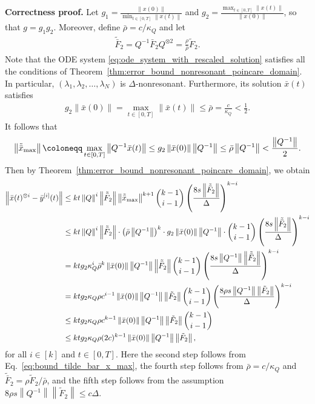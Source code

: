 \documentclass[superscriptaddress,onecolumn,nofootinbib,longbibliography,a4paper,accepted=2026-09-29]{quantumarticle}
\theoremstyle{plain}
\theoremstyle{definition}
\numberwithin{thm}{section}
\numberwithin{assumption}{section}
\numberwithin{lemma}{section}
\numberwithin{prop}{section}
\numberwithin{cor}{section}
\numberwithin{definition}{section}
\numberwithin{rmk}{section}
\numberwithin{equation}{section}
\newcommand{\norm}[1]     {\left\| #1 \right\|}
\newcommand{\lrb}[1]{\left ( #1 \right )}
\newcommand{\defeq}{\coloneqq}
\begin{document}
\noindent \textbf{Correctness proof.}
Let $g_1=\frac{\norm{x(0)}}{\min_{t\in [0,T]} \norm{x(t)}}$ and
$g_2=\frac{\max_{t\in [0, T]}\norm{x(t)}}{\norm{x(0)}}$, so that $g=g_1g_2$. Moreover, define $\bar{\rho}=c/\kappa_Q$ and let
\begin{align}
\tilde{\bar{F}}_2=Q^{-1}\bar{F}_2Q^{\otimes 2}=\frac{\rho}{\bar{\rho}}\tilde{F}_2.    
\end{align}
Note that the ODE system \eqref{eq:ode_system_with_rescaled_solution} satisfies all the conditions of Theorem~\ref{thm:error_bound_nonresonant_poincare_domain}. In particular, $(\lambda_1, \lambda_2, \dots, \lambda_N)$ is $\Delta$-nonresonant. Furthermore, its solution $\bar{x}(t)$  satisfies 
\begin{align}
g_2 \norm{\bar{x}(0)} = \max_{t \in [0, T]}\norm{\bar{x}(t)} \le \bar{\rho}=\frac{c}{\kappa_Q}<\frac{1}{2}.
\end{align}
It follows that
\begin{align}
\norm{\tilde{\bar{x}}_{\rm max}} \defeq \max_{t \in [0, T]}\norm{Q^{-1}\bar{x}(t)} \le  g_2 \norm{\bar{x}(0)} \norm{Q^{-1}}
\le \bar{\rho} \norm{Q^{-1}} < \frac{\norm{Q^{-1}}}{2}.    
\label{eq:bound_tilde_bar_x_max}
\end{align}
Then by Theorem~\ref{thm:error_bound_nonresonant_poincare_domain}, we obtain
\begin{align}
\norm{\bar{x}(t)^{\otimes i}-\bar{y}^{[i]}(t)} 
&\le k t \norm{Q}^{i} \norm{\tilde{\bar{F}}_2}
\norm{\tilde{\bar{x}}_{\rm max}}^{k+1} 
\binom{k-1}{i-1} \lrb{\frac{8 s \norm{\tilde{\bar{F}}_2}}{\Delta}}^{k-i}
\\
&\le k t \norm{Q}^{i} \norm{\tilde{\bar{F}}_2}
\cdot \lrb{\bar{\rho}\norm{Q^{-1}}}^k 
\cdot g_2\norm{\bar{x}(0)} \norm{Q^{-1}}
\cdot \binom{k-1}{i-1} \lrb{\frac{8 s \norm{\tilde{\bar{F}}_2}}{\Delta}}^{k-i} \\
&= k t g_2 \kappa_Q^i \bar{\rho}^{k}\norm{\bar{x}(0)}\norm{Q^{-1}}\norm{\tilde{\bar{F}}_2} \binom{k-1}{i-1} \lrb{\frac{8 s\norm{Q^{-1}} \norm{\tilde{\bar{F}}_2}}{\Delta}}^{k-i} \\
& = 
k t g_2 \kappa_Q \rho c^{i-1} 
  \norm{\bar{x}(0)} \norm{Q^{-1}}\norm{\tilde{F}_2} \binom{k-1}{i-1} \lrb{\frac{8 \rho s\norm{Q^{-1}} \norm{\tilde{F}_2}}{\Delta}}^{k-i}  \\
&\le 
k t g_2 \kappa_Q \rho c^{k-1}  \norm{\bar{x}(0)} \norm{Q^{-1}}\norm{\tilde{F}_2} \binom{k-1}{i-1} \\
& \le 
k t g_2 \kappa_Q \rho (2c)^{k-1}  \norm{\bar{x}(0)} \norm{Q^{-1}}\norm{\tilde{F}_2},  
\label{eq:better_error_bounds_i}
\end{align}
for all $i\in [k]$ and $t \in [0,T]$. Here the second step follows from Eq.~\eqref{eq:bound_tilde_bar_x_max}, the fourth step follows from $\bar{\rho}=c/\kappa_Q$ and $\tilde{\bar{F}}_2=\rho \tilde{F}_2 / \bar{\rho}$, and the fifth step follows from the assumption $8\rho s \norm{Q^{-1}}\norm{\tilde{F}_2}\le c\Delta$.
\end{document}
